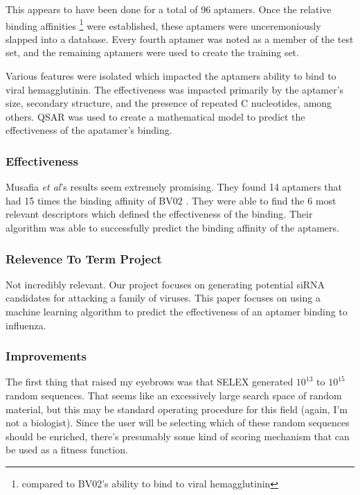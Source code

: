 \documentclass[10pt,a4paper]{article}
\begin{document}
	This appears to have been done for a total of 96 aptamers. 
	Once the relative binding affinities \footnote{compared to BV02's ability to bind to viral hemagglutinin} were established, these aptamers were unceremoniously slapped into a database.
	Every fourth aptamer was noted as a member of the test set, and the remaining aptamers were used to create the training set.
	
	
	
	Various features were isolated which impacted the aptamers ability to bind to viral hemagglutinin.
	The effectiveness was impacted primarily by the aptamer's size, secondary structure, and the presence of repeated C nucleotides, among others.
	QSAR was used to create a mathematical model to predict the effectiveness of the apatamer's binding.
	
	\subsubsection*{Effectiveness}
	Musafia \textit{et al}'s results seem extremely promising.
	They found 14 aptamers that had 15 times the binding affinity of BV02 	 \cite{musafia2014designing}.
	They  were able to find the 6 most relevant descriptors which defined the effectiveness of the binding.
	Their algorithm was able to successfully predict the binding affinity of the aptamers.

	\subsubsection*{Relevence To Term Project}
	Not incredibly relevant.  
	Our project focuses on generating potential siRNA candidates for attacking a family of viruses.
	This  paper focuses on  using a machine learning algorithm to predict the effectiveness of an aptamer binding to influenza.
	
	
	\subsubsection*{Improvements}
	The first thing that raised my eyebrows  was that SELEX generated $ 10^{13 }$  to $ 10^{15} $ random sequences.
	That seems like an excessively large search space of random material, but this may be standard operating procedure for this field (again, I'm not a biologist).
	Since the user will be selecting which of these random sequences should be enriched, there's presumably some kind of scoring mechanism that can be used as a fitness function.
	
\end{document}
